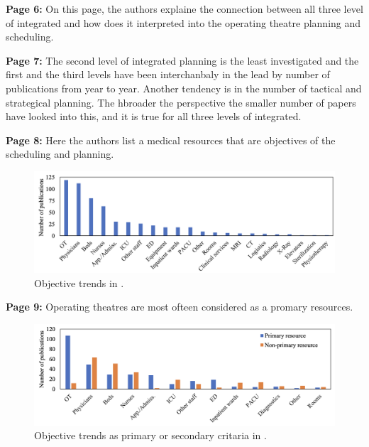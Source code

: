     \textbf{Page 6:}
    On this page, the authors explaine the connection between all three level of integrated and how does it interpreted into the operating theatre planning and scheduling.

    \textbf{Page 7:}
    The second level of integrated planning is the least investigated and the first and the third levels have been interchanbaly in the lead by number of publications from year to year. Another tendency is in the number of tactical and strategical planning. The hbroader the perspective the smaller number of papers have looked into this, and it is true for all three levels of integrated.
    
    \textbf{Page 8:}
    Here the authors list a medical resources that are objectives of the scheduling and planning.
    \begin{figure}[H]
        \centering
        \includegraphics[width=1\textwidth]{figures/0010_SR02NL23/fig2.png}
        \caption{Objective trends in \cite{x338}.}
        \label{fig2:0010_SR02NL23}
    \end{figure}
    
    \textbf{Page 9:}
    Operating theatres are most ofteen considered as a promary resources.
    \begin{figure}[H]
        \centering
        \includegraphics[width=1\textwidth]{figures/0010_SR02NL23/fig3.png}
        \caption{Objective trends as primary or secondary critaria in \cite{x338}.}
        \label{fig3:0010_SR02NL23}
    \end{figure}
    
